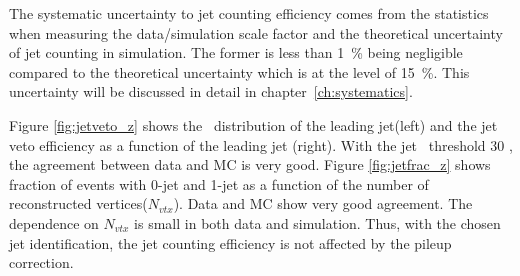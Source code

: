 The systematic uncertainty to jet counting efficiency comes from the statistics 
when measuring the data/simulation scale factor and the theoretical uncertainty of jet 
counting in simulation. The former is less than 1~\% being negligible 
compared to the theoretical uncertainty which is at the level of 15~\%. 
This uncertainty will be discussed in detail in chapter~\ref{ch:systematics}. 

Figure \ref{fig:jetveto_z} shows the \pt~distribution of the leading jet(left) 
and the jet veto efficiency as a function of the leading jet \pt(right).
With the jet \pt~threshold 30 \GeV, the agreement between data and MC is very good. 
Figure \ref{fig:jetfrac_z} shows fraction of events with 0-jet and 
1-jet as a function of the number of reconstructed vertices($N_{vtx}$). 
Data and MC show very good agreement.
The dependence on $N_{vtx}$ is small in both data and simulation.
Thus, with the chosen jet identification, the jet counting efficiency 
is not affected by the pileup correction. 
